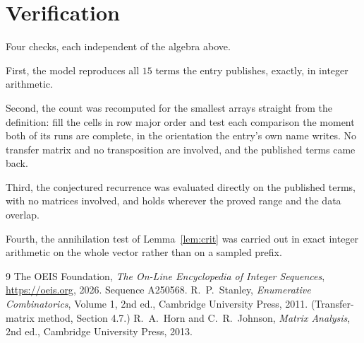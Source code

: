 \documentclass[11pt,a4paper]{article}
\theoremstyle{plain}
\theoremstyle{definition}
\begin{document}
\section{Verification}

Four checks, each independent of the algebra above.

First, the model reproduces all $15$ terms the entry publishes, exactly, in integer
arithmetic.

Second, the count was recomputed for the smallest arrays straight from the definition: fill the
cells in row major order and test each comparison the moment both of its runs are complete,
in the orientation the entry's own name writes. No transfer matrix and no transposition are
involved, and the published terms came back.

Third, the conjectured recurrence was evaluated directly on the published terms, with no
matrices involved, and holds wherever the proved range and the data overlap.

Fourth, the annihilation test of Lemma~\ref{lem:crit} was carried out in exact integer
arithmetic on the whole vector rather than on a sampled prefix.

\begin{thebibliography}{9}
 The OEIS Foundation, \emph{The On-Line Encyclopedia of Integer
Sequences}, \url{https://oeis.org}, 2026. Sequence A250568.
 R.~P.~Stanley, \emph{Enumerative Combinatorics}, Volume 1, 2nd ed.,
Cambridge University Press, 2011. (Transfer-matrix method, Section 4.7.)
 R.~A.~Horn and C.~R.~Johnson, \emph{Matrix Analysis}, 2nd ed., Cambridge
University Press, 2013.
\end{thebibliography}
\end{document}
